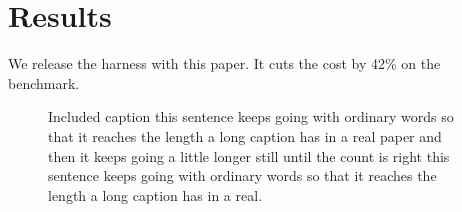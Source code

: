 \section{Results}
We release the harness with this paper. It cuts the cost by 42\% on the benchmark.
\begin{figure}[t]
\centering
{}
\caption{Included caption this sentence keeps going with ordinary words so that it reaches the length a long caption has in a real paper and then it keeps going a little longer still until the count is right this sentence keeps going with ordinary words so that it reaches the length a long caption has in a real.}
\end{figure}
